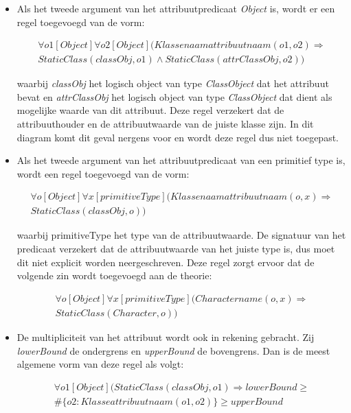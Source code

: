 \begin{itemize}
	\item Als het tweede argument van het attribuutpredicaat \textit{Object} is, wordt er een regel toegevoegd van de vorm:
	
	\begin{align*}
	\forall{o1}[Object]\forall{o2}[Object](Klassenaamattribuutnaam(o1,o2) \Rightarrow \\ StaticClass(classObj,o1) \land StaticClass(attrClassObj,o2))
	\end{align*}
	
	waarbij \textit{classObj} het logisch object van type \textit{ClassObject} dat het attribuut bevat en \textit{attrClassObj} het logisch object van type \textit{ClassObject} dat dient als mogelijke waarde van dit attribuut. Deze regel verzekert dat de attribuuthouder en de attribuutwaarde van de juiste klasse zijn. In dit diagram komt dit geval nergens voor en wordt deze regel dus niet toegepast.
	
	\item Als het tweede argument van het attribuutpredicaat van een primitief type is, wordt een regel toegevoegd van de vorm:
	
	\begin{align*}
	\forall{o}[Object]\forall{x}[primitiveType](Klassenaamattribuutnaam(o,x) \Rightarrow \\ StaticClass(classObj,o))
	\end{align*}
	
	waarbij primitiveType het type van de attribuutwaarde. De signatuur van het predicaat verzekert dat de attribuutwaarde van het juiste type is, dus moet dit niet explicit worden neergeschreven. Deze regel zorgt ervoor dat de volgende zin wordt toegevoegd aan de theorie:
	
	\begin{align*}
	\forall{o}[Object]\forall{x}[primitiveType](Charactername(o,x) \Rightarrow \\ StaticClass(Character,o))
	\end{align*}
	
	\item De multipliciteit van het attribuut wordt ook in rekening gebracht. Zij \textit{lowerBound} de ondergrens en \textit{upperBound} de bovengrens. Dan is de meest algemene vorm van deze regel als volgt:
	
	\begin{align*}
	\forall{o1}[Object](StaticClass(classObj,o1) \Rightarrow lowerBound \geq \\ \#\{o2: Klasseattribuutnaam(o1,o2)\} \geq upperBound
	\end{align*}
	

\end{itemize}
